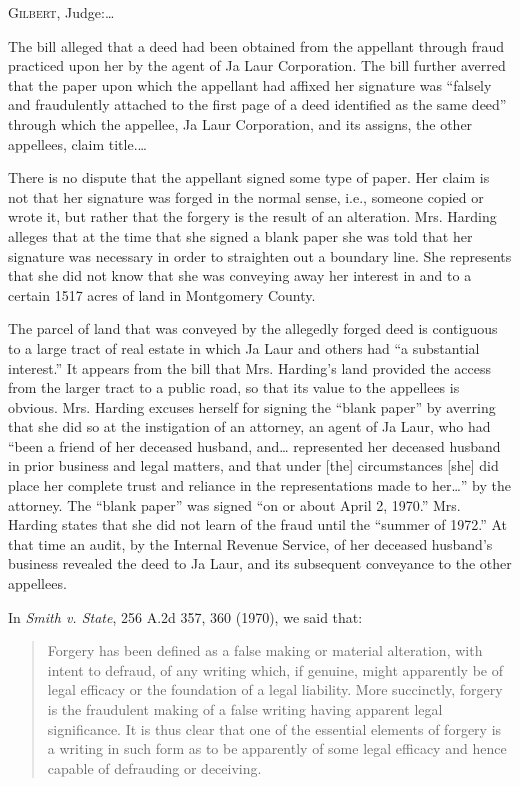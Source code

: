 
\opinion \textsc{Gilbert}, Judge:\ldots

The bill alleged that a deed had been obtained from the appellant through fraud
practiced upon her by the agent of Ja Laur Corporation. The bill further
averred that the paper upon which the appellant had affixed her signature was
``falsely and fraudulently attached to the first page of a deed identified as
the same deed'' through which the appellee, Ja Laur Corporation, and its
assigns, the other appellees, claim title.\ldots

There is no dispute that the appellant signed some type of paper. Her claim is
not that her signature was forged in the normal sense, i.e., someone copied or
wrote it, but rather that the forgery is the result of an alteration. Mrs.
Harding alleges that at the time that she signed a blank paper she was told
that her signature was necessary in order to straighten out a boundary line.
She represents that she did not know that she was conveying away her interest
in and to a certain 1517 acres of land in Montgomery County. 

The parcel of land that was conveyed by the allegedly forged deed is contiguous
to a large tract of real estate in which Ja Laur and others had ``a substantial
interest.'' It appears from the bill that Mrs. Harding's land provided the
access from the larger tract to a public road, so that its value to the
appellees is obvious. Mrs. Harding excuses herself for signing the ``blank
paper'' by averring that she did so at the instigation of an attorney, an agent
of Ja Laur, who had ``been a friend of her deceased husband, and\ldots
represented her deceased husband in prior business and legal matters, and that
under [the] circumstances [she] did place her complete trust and reliance in
the representations made to her\ldots'' by the attorney. The ``blank paper'' was
signed ``on or about April 2, 1970.'' Mrs. Harding states that she did not
learn of the fraud until the ``summer of 1972.'' At that time an audit, by the
Internal Revenue Service, of her deceased husband's business revealed the deed
to Ja Laur, and its subsequent conveyance to the other appellees. 

In \textit{Smith v. State}, 256 A.2d 357, 360 (1970), we said that:
\begin{quote}
Forgery has been defined as a false making or material alteration, with intent
to defraud, of any writing which, if genuine, might apparently be of legal
efficacy or the foundation of a legal liability. More succinctly, forgery is
the fraudulent making of a false writing having apparent legal significance. It
is thus clear that one of the essential elements of forgery is a writing in
such form as to be apparently of some legal efficacy and hence capable of
defrauding or deceiving. 
\end{quote}


